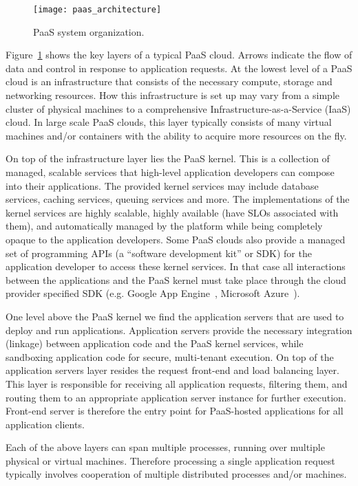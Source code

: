 \begin{figure}
\centering
\texttt{[image: paas\_architecture]}
\caption{PaaS system organization.}
\label{fig:paas_architecture}
\end{figure}

Figure~\ref{fig:paas_architecture} shows the key layers of a typical PaaS cloud. Arrows indicate
the flow of data and control in response to application requests.
At the lowest level of a PaaS cloud is an infrastructure that consists of the necessary compute, storage
and networking resources. How this infrastructure is set up may vary from a simple cluster of physical 
machines to a comprehensive Infrastructure-as-a-Service (IaaS) cloud. In large scale PaaS clouds,
this layer typically consists of many virtual machines and/or containers with the ability to acquire more
resources on the fly.

On top of the infrastructure layer lies the PaaS kernel. This is a collection of managed, scalable
services that high-level application developers can compose into their applications. The provided kernel services
may include database services, caching services, queuing services and more. 
The implementations of the kernel services are highly scalable, highly available (have SLOs associated with them),
and automatically managed by the platform while being completely opaque
to the application developers. Some PaaS clouds
also provide a managed set of programming APIs (a ``software development
kit'' or SDK) for the application developer to access these kernel services. 
In that case all interactions between the applications and the PaaS kernel must take place through
the cloud provider specified SDK (e.g. Google App Engine~\cite{gae}, Microsoft Azure~\cite{azure}). 

One level above the PaaS kernel we find the application servers that are used to deploy and run
applications. Application servers provide the necessary integration (linkage) between application code and the
PaaS kernel services, while sandboxing application code for secure, multi-tenant execution. On top
of the application servers layer resides the request
front-end and load balancing layer. This layer is responsible
for receiving all application requests, filtering them, and routing them to an appropriate application
server instance for further execution. Front-end server is therefore the entry point for PaaS-hosted
applications for all application clients.

Each of the above layers can span multiple processes, running over multiple physical or virtual
machines. Therefore processing a single application request typically involves cooperation
of multiple distributed processes and/or machines.


